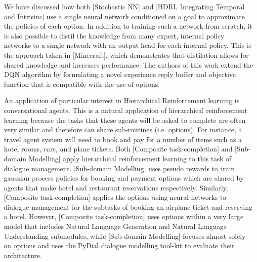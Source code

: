 We have discussed how both [Stochastic NN] and [HDRL Integrating Temporal and Intrisinc]
use a single neural network conditioned on a goal to approximate the policies of each option.
In addition to training such a network from scratch, it is also possible to distil
the knowledge from many expert, internal policy networks to a single network with an
output head for each internal policy. This is the approach taken in [Minecraft], which
demonstrates that distilation allows for shared knowledge and increases performance.
The authors of this work extend the DQN algorithm by formulating a novel
experience reply buffer and objective function that is compatible with the use
of options.

An application of particular interest in Hierarchical Reinforcement learning
is conversational agents. This is a natural application of hierarchical
reinforcement learning because the tasks that these agents will be asked
to complete are often very similar and therefore can share sub-routines
(i.e. options). For instance, a travel agent system will need to book
and pay for a number of items such as a hotel rooms, cars, and plane tickets.
Both [Composite task-completion] and [Sub-domain Modelling] apply hierarchical
reinforcement learning to this task of dialogue management. [Sub-domain Modelling]
uses pseudo rewards to train gaussian process policies for booking and payment options
which are shared by agents that make hotel and restaurant reservations respectively.
Similarly, [Composite task-completion] applies the options using neural networks
to dialogue management for the subtasks of booking an airplane ticket and reserving a hotel.
However, [Composite task-completion] uses options within a very large model that
includes Natural Language Generation and Natural Language Understanding
submodules, while [Sub-domain Modelling] focuses almost solely on options and
uses the PyDial dialogue modelling tool-kit to evaluate their architecture.


